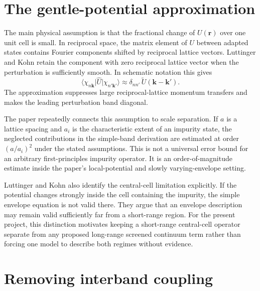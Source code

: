 \section{The gentle-potential approximation}

The main physical assumption is that the fractional change of $U(\mathbf r)$
over one unit cell is small. In reciprocal space, the matrix element of $U$
between adapted states contains Fourier components shifted by reciprocal
lattice vectors. Luttinger and Kohn retain the component with zero reciprocal
lattice vector when the perturbation is sufficiently smooth. In schematic
notation this gives
\begin{equation}
  \langle\chi_{n\mathbf k}\rvert
  \hat U
  \lvert\chi_{n'\mathbf k'}\rangle
  \approx
  \delta_{nn'}\,\widetilde U(\mathbf k-\mathbf k').
  \label{eq:lk-gentle-potential}
\end{equation}
The approximation suppresses large reciprocal-lattice momentum transfers and
makes the leading perturbation band diagonal.

The paper repeatedly connects this assumption to scale separation. If $a$ is a
lattice spacing and $a_i$ is the characteristic extent of an impurity state,
the neglected contributions in the simple-band derivation are estimated at
order $(a/a_i)^2$ under the stated assumptions. This is not a universal error
bound for an arbitrary first-principles impurity operator. It is an
order-of-magnitude estimate inside the paper's local-potential and slowly
varying-envelope setting.

Luttinger and Kohn also identify the central-cell limitation explicitly. If the
potential changes strongly inside the cell containing the impurity, the simple
envelope equation is not valid there. They argue that an envelope description
may remain valid sufficiently far from a short-range region. For the present
project, this distinction motivates keeping a short-range central-cell operator
separate from any proposed long-range screened continuum term rather than
forcing one model to describe both regimes without evidence.

\section{Removing interband coupling}

